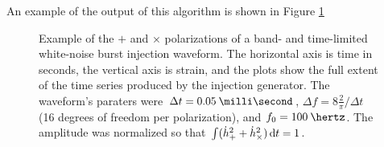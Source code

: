 \documentclass[10pt]{article}
\begin{document}
An example of the output of this algorithm is shown in Figure \ref{fig5}
\begin{figure}
\begin{center}
%
\end{center}
\caption{Example of the \(+\) and \(\times\) polarizations of a band- and
time-limited white-noise burst injection waveform.  The horizontal axis is
time in seconds, the vertical axis is strain, and the plots show the full
extent of the time series produced by the injection generator.  The
waveform's paraters were \(\Delta t = \unit{0.05}{\milli\second}\),
\(\Delta f = 8 \frac{2}{\pi} / \Delta t\) (16 degrees of freedom per
polarization), and \(f_{0} = \unit{100}{\hertz}\).  The amplitude was
normalized so that \(\int (\dot{h}_{+}^{2} + \dot{h}_{\times}^{2}) \,\mathrm{d} t
= 1\).}
\label{fig5}
\end{figure}
\end{document}
